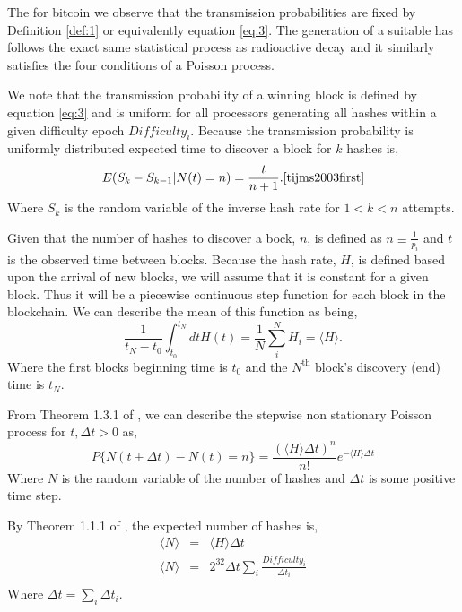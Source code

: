 \documentclass[runningheads]{llncs}
\begin{document}
The for bitcoin we observe that the transmission probabilities are fixed by Definition \ref{def:1} or equivalently equation \ref{eq:3}.
The generation of a suitable has follows the exact same statistical process as radioactive decay and it similarly satisfies the four conditions of a Poisson process.

We note that the transmission probability of a winning block is defined by equation \ref{eq:3} and is uniform for all processors generating all hashes within a given difficulty epoch $Difficulty_i$.
Because the transmission probability is uniformly distributed expected time to discover a block for $k$ hashes is, 
\begin{equation}
    E(S_k - S_{k - 1}| N(t) = n) = \frac{t}{n + 1}.\mbox{\cite{tijms2003first}}
\end{equation}
Where $S_k$ is the random variable of the inverse hash rate for $1 < k < n$ attempts.

Given that the number of hashes to discover a bock, $n$, is defined as $n \equiv \frac{1}{p_i}$ and $t$ is the observed time between blocks.
Because the hash rate, $H$, is defined based upon the arrival of new blocks, we will assume that it is constant for a given block.
Thus it will be a piecewise continuous step function for each block in the blockchain.
We can describe the mean of this function as being,
\begin{equation}
    \frac{1}{t_N - t_0}\int_{t_0}^{t_N} dt H(t) =  \frac{1}{N}\sum_i^N H_i = \langle H \rangle. \label{eq:7}
\end{equation}
Where the first blocks beginning time is $t_0$ and the $N^{\mbox{th}}$ block's discovery (end) time is $t_N$.

From Theorem 1.3.1 of \cite{tijms2003first}, we can describe the stepwise non stationary Poisson process for $t,\Delta t >0$ as,
\begin{equation}
    P\lbrace N(t + \Delta t) - N(t)= n\rbrace = \frac{(\langle H \rangle \Delta t)^n}{n!}e^{-\langle H \rangle \Delta t}\label{eq:8}
\end{equation}
Where $N$ is the random variable of the number of hashes and $\Delta t$ is some positive time step.

By Theorem 1.1.1 of \cite{tijms2003first}, the expected number of hashes is,
\begin{eqnarray}
    \langle N \rangle &=& \langle H \rangle \Delta t \\
    \langle N \rangle &=& 2^{32} \Delta t \sum_i \frac{Difficulty_i}{\Delta t_i} \\
\end{eqnarray}
Where $\Delta t = \sum_i \Delta t_i$.
\end{document}
